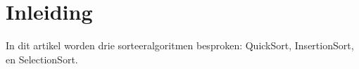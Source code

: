 \section{Inleiding}

In dit artikel worden drie sorteeralgoritmen besproken: QuickSort, InsertionSort, en SelectionSort. 
